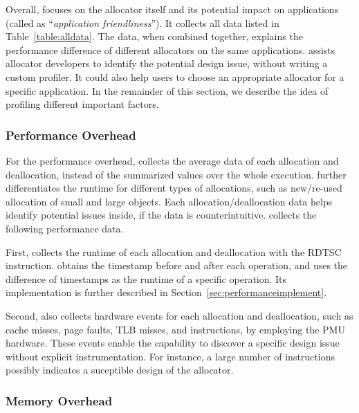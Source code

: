 Overall, \MP{} focuses on the allocator itself and its potential impact on applications (called as ``\textit{application friendliness}''). It  collects all data listed in Table~\ref{table:alldata}. The data, when combined together, explains the performance difference of different allocators on the same applications. \MP{} assists allocator developers to identify the potential design issue, without writing a custom profiler. It could also help users to choose an appropriate allocator for a specific application. In the remainder of this section, we describe the idea of profiling different important factors. 



\subsubsection{Performance Overhead}

For the performance overhead, \MP{} collects the average data of each allocation and deallocation, instead of the summarized values over the whole execution. \MP{} further differentiates the runtime for different types of allocations, such as new/re-used allocation of small and large objects. Each allocation/deallocation data helps identify potential issues inside, if the data is counterintuitive. \MP{} collects the following performance data. 

First, \MP{} collects the runtime of each allocation and deallocation with the RDTSC instruction.  \MP{} obtains the timestamp before and after each operation, and uses the difference of timestamps as the runtime of a specific operation. Its implementation is further described in Section~\ref{sec:performanceimplement}. 

Second, \MP{} also collects hardware events for each allocation and deallocation, such as cache misses, page faults, TLB misses, and instructions, by employing the PMU hardware. These events enable the capability to discover a specific design issue without explicit instrumentation. For instance, a large number of instructions possibly indicates a suceptible design of the allocator. 

\subsubsection{Memory Overhead}

